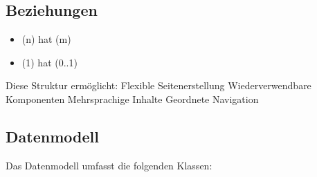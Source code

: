 \documentclass[a4paper,12pt,ngerman]{sphinxmanual}
\begin{document}
\subsection{Beziehungen}
\label{\detokenize{sections/entwurf:beziehungen}}\begin{itemize}
\item {} 
\sphinxAtStartPar
{} (n) hat  (m)

\item {} 
\sphinxAtStartPar
{} (1) hat  (0..1)

\end{itemize}

\sphinxAtStartPar
Diese Struktur ermöglicht:
\sphinxhyphen{} Flexible Seitenerstellung
\sphinxhyphen{} Wiederverwendbare Komponenten
\sphinxhyphen{} Mehrsprachige Inhalte
\sphinxhyphen{} Geordnete Navigation


\subsection{Datenmodell}
\label{\detokenize{sections/entwurf:datenmodell}}
\sphinxAtStartPar
Das Datenmodell umfasst die folgenden Klassen:
\end{document}
